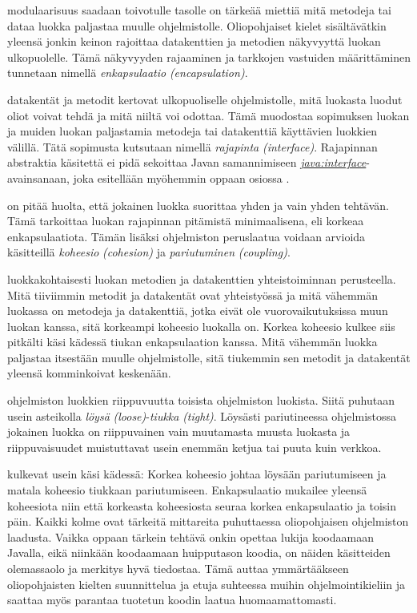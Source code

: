 \documentclass[a4paper,justified,notoc]{tufte-book}
\newcommand{\eng}[1]{\textit{(#1)}}
\newcommand{\new}[1]{\textit{\gls{#1}}}
\newcommand{\newnogls}[1]{\textit{#1}}
\newcommand{\neweng}[2]{\new{#1} \eng{#2}}
\newcommand{\newengnogls}[2]{\newnogls{#1} \eng{#2}}
\newcommand{\java}[1]{\underline{\gls{java:#1}}}
\newcommand{\newjava}[1]{\textit{\java{#1}}}
\begin{document}
\begin{fullwidth}
 modulaarisuus saadaan toivotulle tasolle on tärkeää miettiä mitä
metodeja tai dataa luokka paljastaa muulle ohjelmistolle. Oliopohjaiset kielet sisältävätkin
yleensä jonkin keinon rajoittaa datakenttien ja metodien näkyvyyttä luokan ulkopuolelle. Tämä
näkyvyyden rajaaminen ja tarkkojen vastuiden määrittäminen tunnetaan nimellä
\neweng{enkapsulaatio}{encapsulation}.

 datakentät ja metodit kertovat ulkopuoliselle ohjelmistolle, mitä
luokasta luodut oliot voivat tehdä ja mitä niiltä voi odottaa. Tämä muodostaa sopimuksen luokan ja
muiden luokan paljastamia metodeja tai datakenttiä käyttävien luokkien välillä. Tätä sopimusta
kutsutaan nimellä \neweng{rajapinta}{interface}. Rajapinnan abstraktia käsitettä ei pidä sekoittaa
Javan samannimiseen \newjava{interface}-avainsanaan, joka esitellään myöhemmin oppaan osiossa
.

 on pitää huolta, että jokainen luokka
suorittaa yhden ja vain yhden tehtävän. Tämä tarkoittaa luokan rajapinnan pitämistä minimaalisena,
eli korkeaa enkapsulaatiota. Tämän lisäksi ohjelmiston peruslaatua voidaan arvioida käsitteillä
\neweng{koheesio}{cohesion} ja \neweng{pariutuminen}{coupling}.

 luokkakohtaisesti luokan metodien ja datakenttien
yhteistoiminnan perusteella. Mitä tiiviimmin metodit ja datakentät ovat yhteistyössä ja mitä
vähemmän luokassa on metodeja ja datakenttiä, jotka eivät ole vuorovaikutuksissa muun luokan
kanssa, sitä korkeampi koheesio luokalla on. Korkea koheesio kulkee siis pitkälti käsi kädessä
tiukan enkapsulaation kanssa. Mitä vähemmän luokka paljastaa itsestään muulle ohjelmistolle, sitä
tiukemmin sen metodit ja datakentät yleensä komminkoivat keskenään.

 ohjelmiston luokkien riippuvuutta toisista ohjelmiston
luokista. Siitä puhutaan usein asteikolla \newengnogls{löysä}{loose}-\newengnogls{tiukka}{tight}.
Löysästi pariutineessa ohjelmistossa jokainen luokka on riippuvainen vain muutamasta muusta
luokasta ja riippuvaisuudet muistuttavat usein enemmän ketjua tai puuta kuin verkkoa.

 kulkevat usein käsi kädessä: Korkea koheesio johtaa löysään
pariutumiseen ja matala koheesio tiukkaan pariutumiseen. Enkapsulaatio mukailee yleensä koheesiota
niin että korkeasta koheesiosta seuraa korkea enkapsulaatio ja toisin päin. Kaikki kolme ovat
tärkeitä mittareita puhuttaessa oliopohjaisen ohjelmiston laadusta. Vaikka oppaan tärkein tehtävä
onkin opettaa lukija koodaamaan Javalla, eikä niinkään koodaamaan huipputason koodia, on näiden
käsitteiden olemassaolo ja merkitys hyvä tiedostaa. Tämä auttaa ymmärtääkseen oliopohjaisten
kielten suunnittelua ja etuja suhteessa muihin ohjelmointikieliin ja saattaa myös parantaa
tuotetun koodin laatua huomaamattomasti.


\end{fullwidth}
\end{document}
